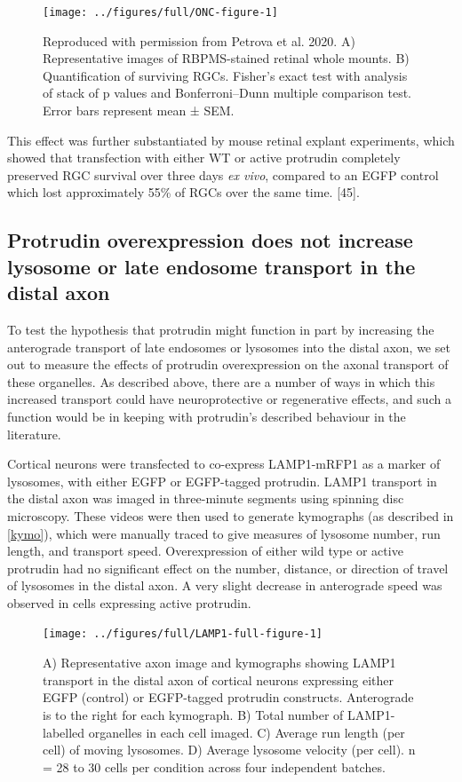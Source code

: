 \documentclass[
  12pt,
  a4paper,
]{book}
\begin{document}
\begin{figure}
\texttt{[image: ../figures/full/ONC-figure-1]} \caption[RGC neuroprotection experiment from Petrova et al. 2020]{Reproduced with permission from Petrova et al. 2020.  A) Representative images of RBPMS-stained retinal whole mounts.  B) Quantification of surviving RGCs.   Fisher’s exact test with analysis of stack of p values and Bonferroni–Dunn multiple comparison test. Error bars represent mean ± SEM.}\label{fig:ONC-figure}
\end{figure}

This effect was further substantiated by mouse retinal explant experiments, which showed that transfection with either WT or active protrudin completely preserved RGC survival over three days \emph{ex vivo}, compared to an EGFP control which lost approximately 55\% of RGCs over the same time. {[}45{]}.

\hypertarget{lyso-LE}{%
\subsection{Protrudin overexpression does not increase lysosome or late endosome transport in the distal axon}\label{lyso-LE}}

To test the hypothesis that protrudin might function in part by increasing the anterograde transport of late endosomes or lysosomes into the distal axon, we set out to measure the effects of protrudin overexpression on the axonal transport of these organelles. As described above, there are a number of ways in which this increased transport could have neuroprotective or regenerative effects, and such a function would be in keeping with protrudin's described behaviour in the literature.

Cortical neurons were transfected to co-express LAMP1-mRFP1 as a marker of lysosomes, with either EGFP or EGFP-tagged protrudin. LAMP1 transport in the distal axon was imaged in three-minute segments using spinning disc microscopy. These videos were then used to generate kymographs (as described in \ref{kymo}), which were manually traced to give measures of lysosome number, run length, and transport speed. Overexpression of either wild type or active protrudin had no significant effect on the number, distance, or direction of travel of lysosomes in the distal axon. A very slight decrease in anterograde speed was observed in cells expressing active protrudin.

\begin{figure}
\texttt{[image: ../figures/full/LAMP1-full-figure-1]} \caption[Protrudin effect on lysosome (LAMP1) transport in the distal axon]{A) Representative axon image and kymographs showing LAMP1 transport in the distal axon of cortical neurons expressing either EGFP (control) or EGFP-tagged protrudin constructs.  Anterograde is to the right for each kymograph.  B) Total number of LAMP1-labelled organelles in each cell imaged.  C) Average run length (per cell) of moving lysosomes.  D) Average lysosome velocity (per cell).  n = 28 to 30 cells per condition across four independent batches.}\label{fig:LAMP1-full-figure}
\end{figure}
\end{document}
